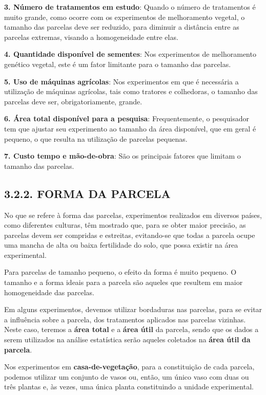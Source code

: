 \documentclass[
]{book}
\begin{document}
\textbf{3. Número de tratamentos em estudo}: Quando o número de tratamentos é muito grande, como ocorre com os experimentos de melhoramento vegetal, o tamanho das parcelas deve ser reduzido, para diminuir a distância entre as parcelas extremas, visando a homogeneidade entre elas.

\textbf{4. Quantidade disponível de sementes}: Nos experimentos de melhoramento genético vegetal, este é um fator limitante para o tamanho das parcelas.

\textbf{5. Uso de máquinas agrícolas}: Nos experimentos em que é necessária a utilização de máquinas agrícolas, tais como tratores e colhedoras, o tamanho das parcelas deve ser, obrigatoriamente, grande.

\textbf{6. Área total disponível para a pesquisa}: Frequentemente, o pesquisador tem que ajustar seu experimento ao tamanho da área disponível, que em geral é pequeno, o que resulta na utilização de parcelas pequenas.

\textbf{7. Custo tempo e mão-de-obra}: São os principais fatores que limitam o tamanho das parcelas.

\hypertarget{forma-da-parcela}{%
\subsection{3.2.2. FORMA DA PARCELA}\label{forma-da-parcela}}

No que se refere à forma das parcelas, experimentos realizados em diversos países, como diferentes culturas, têm mostrado que, para se obter maior precisão, as parcelas devem ser compridas e estreitas, evitando-se que todas a parcela ocupe uma mancha de alta ou baixa fertilidade do solo, que possa existir na área experimental.

Para parcelas de tamanho pequeno, o efeito da forma é muito pequeno. O tamanho e a forma ideais para a parcela são aqueles que resultem em maior homogeneidade das parcelas.

Em alguns experimentos, devemos utilizar bordaduras nas parcelas, para se evitar a influência sobre a parcela, dos tratamentos aplicados nas parcelas vizinhas. Neste caso, teremos a \textbf{área total} e a \textbf{área útil} da parcela, sendo que os dados a serem utilizados na análise estatística serão aqueles coletados na \textbf{área útil da parcela}.

Nos experimentos em \textbf{casa-de-vegetação}, para a constituição de cada parcela, podemos utilizar um conjunto de vasos ou, então, um único vaso com duas ou três plantas e, às vezes, uma única planta constituindo a unidade experimental.
\end{document}

